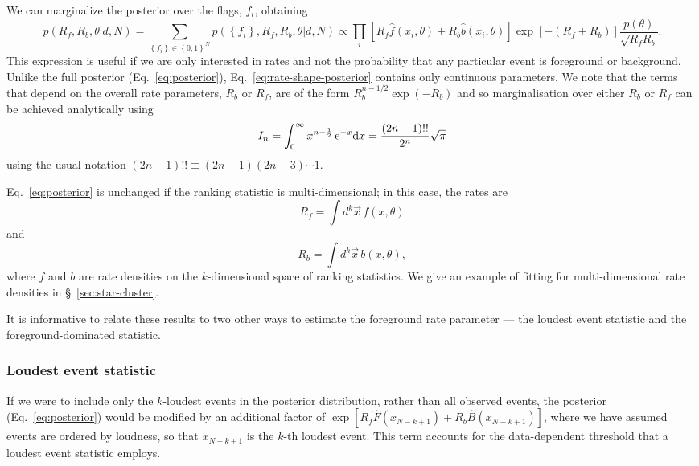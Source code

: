 \documentclass[aps,prd]{revtex4-1}
\newcommand{\mathset}[1]{\left\{ #1 \right\}}
\begin{document}
We can marginalize the posterior over the flags, $f_i$, obtaining
\begin{equation}
  \label{eq:rate-shape-posterior}
  p\left( R_f, R_b, \theta | d, N \right) = \sum_{\mathset{f_i} \in
    \mathset{0,1}^N} p\left( \mathset{f_i}, R_f, R_b, \theta | d, N \right)
  \propto \prod_{i} \left[ R_f \hat{f}\left(x_i, \theta\right) + R_b
    \hat{b}\left( x_i, \theta\right) \right] \exp\left[-\left( R_f +
      R_b \right) \right] \frac{p(\theta)}{\sqrt{R_f R_b}}.
\end{equation}
This expression is useful if we are only interested in rates and not
the probability that any particular event is foreground or background.
Unlike the full posterior (Eq.~\eqref{eq:posterior}),
Eq.~\eqref{eq:rate-shape-posterior} contains only continuous
parameters. We note that the terms that depend on the overall rate parameters, $R_b$ or $R_f$, are of the form $R_b^{n-1/2} \exp(-R_b)$ and so marginalisation over either $R_b$ or $R_f$ can be achieved analytically using
\begin{equation}
I_n = \int_0^{\infty} x^{n-\frac{1}{2}} \, {\rm e}^{-x} {\rm d} x = \frac{(2n-1)!!}{2^n} \sqrt{\pi}
\end{equation}
using the usual notation $(2n-1)!! \equiv (2n-1)(2n-3)\cdots1$.

Eq.~\eqref{eq:posterior} is unchanged if the ranking statistic is
multi-dimensional; in this case, the rates are 
\begin{equation}
  R_f = \int d^k \vec{x} \, f(x, \theta)
\end{equation}
and
\begin{equation}
  R_b = \int d^k \vec{x} \, b(x, \theta),  
\end{equation}
where $f$ and $b$ are rate densities on the $k$-dimensional
space of ranking statistics.  We give an example of fitting for
multi-dimensional rate densities in \S~\ref{sec:star-cluster}.

It is informative to relate these results to two other ways to estimate the foreground rate parameter --- the loudest event statistic and the foreground-dominated statistic.

\subsubsection{Loudest event statistic}
If we were to include only the $k$-loudest events in the posterior distribution, rather than all observed events, the posterior (Eq.~\eqref{eq:posterior}) would be modified by an additional factor of $\exp[R_f \hat{F}(x_{N-k+1}) + R_b \hat{B}(x_{N-k+1})]$, where we have assumed events are ordered by loudness, so that $x_{N-k+1}$ is the $k$-th loudest event. This term accounts for the data-dependent threshold that a loudest event statistic employs.
\end{document}
